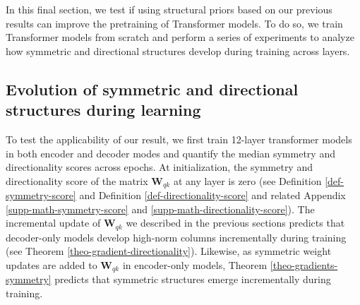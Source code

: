 %
In this final section, we test if using structural priors based on our previous results can improve the pretraining of Transformer models. 
%
To do so, we train Transformer models from scratch and perform a series of experiments to analyze how symmetric and directional structures develop during training across layers.
%





\subsection{Evolution of symmetric and directional structures during learning}
\label{sec-evolution-structures}
%

%
To test the applicability of our result, we first train 12-layer transformer models in both encoder and decoder modes and quantify the median symmetry and directionality scores across epochs.
%
At initialization, the symmetry and directionality score of the matrix $\bm{W}_{qk}$ at any layer is zero (see  Definition \ref{def-symmetry-score} and Definition \ref{def-directionality-score} and related Appendix  \ref{supp-math-symmetry-score} and \ref{supp-math-directionality-score}).
%
The incremental update of $\bm{W}_{qk}$ we described in the previous sections predicts that decoder-only models develop high-norm columns incrementally during training (see Theorem \ref{theo-gradient-directionality}).
%
Likewise, as symmetric weight updates are added to $\bm{W}_{qk}$ in encoder-only models, Theorem \ref{theo-gradients-symmetry} predicts that symmetric structures emerge incrementally during training.
%

%

